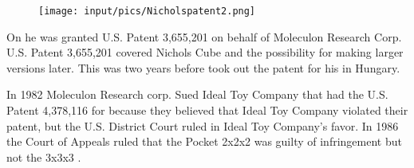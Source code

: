 \begin{figure}[htb]
	\centering
		\texttt{[image: input/pics/Nicholspatent2.png]}
	\caption{}
	\label{fig:Nicholspatent2}
\end{figure}

On  he was granted U.S. Patent 3,655,201 on behalf of Moleculon Research Corp. U.S. Patent 3,655,201 covered Nichols Cube and the possibility for making larger versions later. This was two years before \erno{} took out the patent for his \rubik{} in Hungary. 

In 1982 Moleculon Research corp.  Sued Ideal Toy Company that had the U.S. Patent 4,378,116 for \rubik{} because they believed that Ideal Toy Company violated their patent, but the U.S. District Court ruled in Ideal Toy Company's favor. In 1986 the Court of Appeals ruled that the Pocket \rubik{} 2x2x2 was guilty of infringement but not the 3x3x3 \rubik{}. 



%